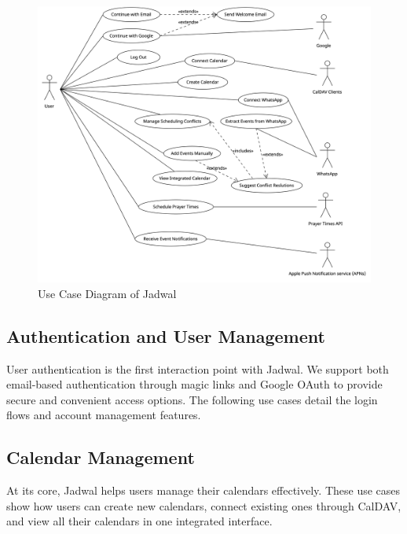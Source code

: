 \documentclass[12pt,a4paper]{report}
\begin{document}
\begin{figure}[!h]
    \centering
    \includegraphics[width=\textwidth]{images/use-case-diagram.png}
    \caption{Use Case Diagram of Jadwal}
    \label{fig:use-case-diagram}
\end{figure}

\subsection{Authentication and User Management}
User authentication is the first interaction point with Jadwal. We support both email-based authentication through magic links and Google OAuth to provide secure and convenient access options. The following use cases detail the login flows and account management features.






\subsection{Calendar Management}
At its core, Jadwal helps users manage their calendars effectively. These use cases show how users can create new calendars, connect existing ones through CalDAV, and view all their calendars in one integrated interface.




\end{document}

